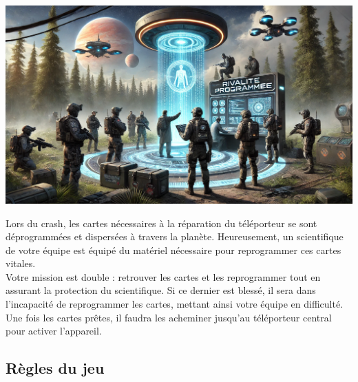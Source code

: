 \documentclass{template}
\begin{document}
\begin{minipage}[t]{0.48\textwidth}
    \vspace{0em}
    \includegraphics[width=\linewidth]{docs/img/variante3.png}
\end{minipage}
\hfill
\begin{minipage}[t]{0.48\textwidth}
Lors du crash, les cartes nécessaires à la réparation du téléporteur se sont déprogrammées et dispersées à travers la planète. Heureusement, un scientifique de votre équipe est équipé du matériel nécessaire pour reprogrammer ces cartes vitales. \\

Votre mission est double : retrouver les cartes et les reprogrammer tout en assurant la protection du scientifique. Si ce dernier est blessé, il sera dans l’incapacité de reprogrammer les cartes, mettant ainsi votre équipe en difficulté. Une fois les cartes prêtes, il faudra les acheminer jusqu’au téléporteur central pour activer l’appareil.
\end{minipage}


\subsection*{Règles du jeu}
\end{document}
